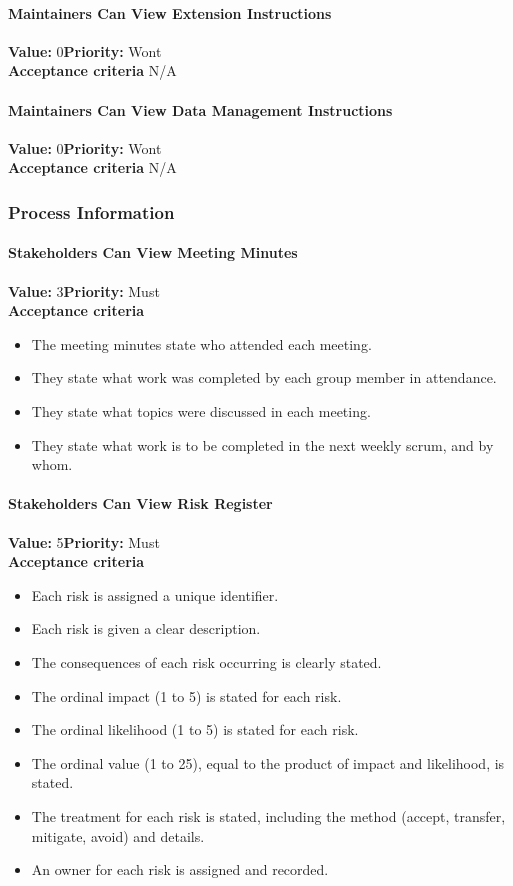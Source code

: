 \paragraph{Maintainers Can View Extension Instructions}
\textbf{Value:} 0\quad \textbf{Priority:} Wont\\
\textbf{Acceptance criteria} N/A

\paragraph{Maintainers Can View Data Management Instructions}
\textbf{Value:} 0\quad \textbf{Priority:} Wont\\
\textbf{Acceptance criteria} N/A

\subsubsection{Process Information}

\paragraph{Stakeholders Can View Meeting Minutes}
\textbf{Value:} 3\quad \textbf{Priority:} Must\\
\textbf{Acceptance criteria}
\begin{itemize}
  \item The meeting minutes state who attended each meeting.
  \item They state what work was completed by each group member in attendance.
  \item They state what topics were discussed in each meeting.
  \item They state what work is to be completed in the next weekly scrum, and by whom.
\end{itemize}

\paragraph{Stakeholders Can View Risk Register}
\textbf{Value:} 5\quad \textbf{Priority:} Must\\
\textbf{Acceptance criteria}
\begin{itemize}
  \item Each risk is assigned a unique identifier.
  \item Each risk is given a clear description.
  \item The consequences of each risk occurring is clearly stated.
  \item The ordinal impact (1 to 5) is stated for each risk.
  \item The ordinal likelihood (1 to 5) is stated for each risk.
  \item The ordinal value (1 to 25), equal to the product of impact and likelihood, is stated.
  \item The treatment for each risk is stated, including the method (accept, transfer, mitigate, avoid) and details.
  \item An owner for each risk is assigned and recorded.
\end{itemize}

